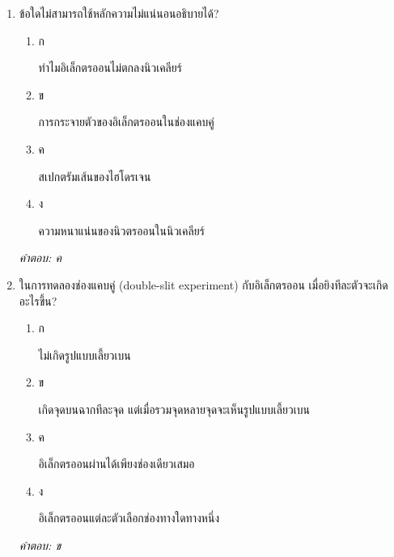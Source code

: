 \documentclass[12pt]{article}
\begin{document}
\begin{enumerate}[label=\arabic*., itemsep=0.5\baselineskip, topsep=0.5\baselineskip, leftmargin=*]
\item ข้อใดไม่สามารถใช้หลักความไม่แน่นอนอธิบายได้?
\begin{enumerate}[label=\alph*)., itemsep=0.3\baselineskip, topsep=0.3\baselineskip]
\item ก\ 
\begin{minipage}[t]{0.9\linewidth}
\raggedright ทำไมอิเล็กตรออนไม่ตกลงนิวเคลียร์
\end{minipage}
\item ข\ 
\begin{minipage}[t]{0.9\linewidth}
\raggedright การกระจายตัวของอิเล็กตรออนในช่องแคบคู่
\end{minipage}
\item ค\ 
\begin{minipage}[t]{0.9\linewidth}
\raggedright สเปกตรัมเส้นของไฮโดรเจน
\end{minipage}
\item ง\ 
\begin{minipage}[t]{0.9\linewidth}
\raggedright ความหนาแน่นของนิวตรออนในนิวเคลียร์
\end{minipage}
\end{enumerate}
\vspace{-0.3\baselineskip}
\begin{small}
\textit{คำตอบ: ค}
\end{small}

\item ในการทดลองช่องแคบคู่ (double-slit experiment) กับอิเล็กตรออน เมื่อยิงทีละตัวจะเกิดอะไรขึ้น?
\begin{enumerate}[label=\alph*)., itemsep=0.3\baselineskip, topsep=0.3\baselineskip]
\item ก\ 
\begin{minipage}[t]{0.9\linewidth}
\raggedright ไม่เกิดรูปแบบเลี้ยวเบน
\end{minipage}
\item ข\ 
\begin{minipage}[t]{0.9\linewidth}
\raggedright เกิดจุดบนฉากทีละจุด แต่เมื่อรวมจุดหลายจุดจะเห็นรูปแบบเลี้ยวเบน
\end{minipage}
\item ค\ 
\begin{minipage}[t]{0.9\linewidth}
\raggedright อิเล็กตรออนผ่านได้เพียงช่องเดียวเสมอ
\end{minipage}
\item ง\ 
\begin{minipage}[t]{0.9\linewidth}
\raggedright อิเล็กตรออนแต่ละตัวเลือกช่องทางใดทางหนึ่ง
\end{minipage}
\end{enumerate}
\vspace{-0.3\baselineskip}
\begin{small}
\textit{คำตอบ: ข}
\end{small}


\end{enumerate}
\end{document}
